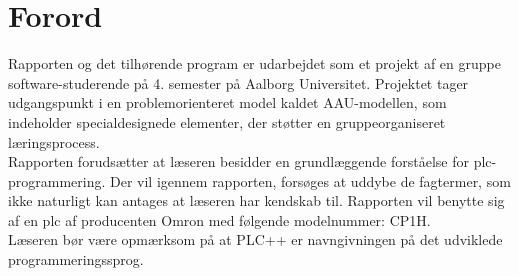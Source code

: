 \section*{Forord}
\label{sec:forord}
Rapporten og det tilhørende program er udarbejdet som et projekt af en gruppe software-studerende på 4. semester på Aalborg Universitet. Projektet tager udgangspunkt i en problemorienteret model kaldet AAU-modellen, som indeholder specialdesignede elementer, der støtter en gruppeorganiseret læringsprocess. \\

\noindent Rapporten forudsætter at læseren besidder en grundlæggende forståelse for \gls{plc}-programmering. Der vil igennem rapporten, forsøges at uddybe de fagtermer, som ikke naturligt kan antages at læseren har kendskab til. Rapporten vil benytte sig af en \gls{plc} af producenten Omron med følgende modelnummer: CP1H. \\

\noindent Læseren bør være opmærksom på at PLC++ er navngivningen på det udviklede programmeringssprog.